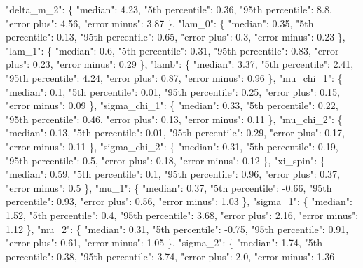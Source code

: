{{        "delta\_m\_2": \{%
          "median": 4.23, %
          "5th percentile": 0.36, %
          "95th percentile": 8.8, %
          "error plus": 4.56, %
          "error minus": 3.87%
        \}, %
        "lam\_0": \{%
          "median": 0.35, %
          "5th percentile": 0.13, %
          "95th percentile": 0.65, %
          "error plus": 0.3, %
          "error minus": 0.23%
        \}, %
        "lam\_1": \{%
          "median": 0.6, %
          "5th percentile": 0.31, %
          "95th percentile": 0.83, %
          "error plus": 0.23, %
          "error minus": 0.29%
        \}, %
        "lamb": \{%
          "median": 3.37, %
          "5th percentile": 2.41, %
          "95th percentile": 4.24, %
          "error plus": 0.87, %
          "error minus": 0.96%
        \}, %
        "mu\_chi\_1": \{%
          "median": 0.1, %
          "5th percentile": 0.01, %
          "95th percentile": 0.25, %
          "error plus": 0.15, %
          "error minus": 0.09%
        \}, %
        "sigma\_chi\_1": \{%
          "median": 0.33, %
          "5th percentile": 0.22, %
          "95th percentile": 0.46, %
          "error plus": 0.13, %
          "error minus": 0.11%
        \}, %
        "mu\_chi\_2": \{%
          "median": 0.13, %
          "5th percentile": 0.01, %
          "95th percentile": 0.29, %
          "error plus": 0.17, %
          "error minus": 0.11%
        \}, %
        "sigma\_chi\_2": \{%
          "median": 0.31, %
          "5th percentile": 0.19, %
          "95th percentile": 0.5, %
          "error plus": 0.18, %
          "error minus": 0.12%
        \}, %
        "xi\_spin": \{%
          "median": 0.59, %
          "5th percentile": 0.1, %
          "95th percentile": 0.96, %
          "error plus": 0.37, %
          "error minus": 0.5%
        \}, %
        "mu\_1": \{%
          "median": 0.37, %
          "5th percentile": {-}0.66, %
          "95th percentile": 0.93, %
          "error plus": 0.56, %
          "error minus": 1.03%
        \}, %
        "sigma\_1": \{%
          "median": 1.52, %
          "5th percentile": 0.4, %
          "95th percentile": 3.68, %
          "error plus": 2.16, %
          "error minus": 1.12%
        \}, %
        "mu\_2": \{%
          "median": 0.31, %
          "5th percentile": {-}0.75, %
          "95th percentile": 0.91, %
          "error plus": 0.61, %
          "error minus": 1.05%
        \}, %
        "sigma\_2": \{%
          "median": 1.74, %
          "5th percentile": 0.38, %
          "95th percentile": 3.74, %
          "error plus": 2.0, %
          "error minus": 1.36%
}}
